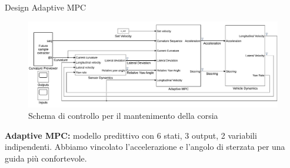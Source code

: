 \documentclass{beamer}
\begin{document}
	\begin{frame}{Design Adaptive MPC} %
		\begin{figure}[!h]
			\includegraphics[width=\textwidth]{./images/lane_following_AMPC.pdf}
			\caption{Schema di controllo per il mantenimento della corsia}
			\label{fig:scheme_lane_following}
		\end{figure}
		\textbf{Adaptive MPC:} modello predittivo con 6 stati, 3 output, 2 variabili indipendenti. Abbiamo vincolato l'accelerazione e l'angolo di sterzata per una guida più confortevole.
	\end{frame}
\end{document}
